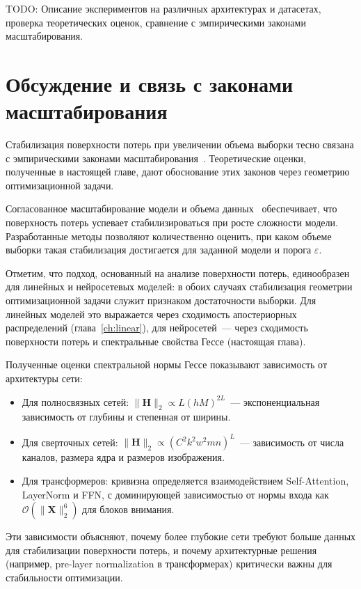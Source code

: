 TODO: Описание экспериментов на различных архитектурах и датасетах, проверка теоретических оценок, сравнение с эмпирическими законами масштабирования.

\section{Обсуждение и связь с законами масштабирования}

Стабилизация поверхности потерь при увеличении объема выборки тесно связана с эмпирическими законами масштабирования~\cite{kaplan2020scaling,hoffmann2022chinchila}. Теоретические оценки, полученные в настоящей главе, дают обоснование этих законов через геометрию оптимизационной задачи.

Согласованное масштабирование модели и объема данных~\cite{hoffmann2022chinchila} обеспечивает, что поверхность потерь успевает стабилизироваться при росте сложности модели. Разработанные методы позволяют количественно оценить, при каком объеме выборки такая стабилизация достигается для заданной модели и порога $\varepsilon$.

Отметим, что подход, основанный на анализе поверхности потерь, единообразен для линейных и нейросетевых моделей: в обоих случаях стабилизация геометрии оптимизационной задачи служит признаком достаточности выборки. Для линейных моделей это выражается через сходимость апостериорных распределений (глава~\ref{ch:linear}), для нейросетей~--- через сходимость поверхности потерь и спектральные свойства Гессе (настоящая глава).

Полученные оценки спектральной нормы Гессе показывают зависимость от архитектуры сети:
\begin{itemize}
\item Для полносвязных сетей: $\|\mathbf{H}\|_2 \propto L (hM)^{2L}$~--- экспоненциальная зависимость от глубины и степенная от ширины.
\item Для сверточных сетей: $\|\mathbf{H}\|_2 \propto (C^2 k^2 w^2 m n)^L$~--- зависимость от числа каналов, размера ядра и размеров изображения.
\item Для трансформеров: кривизна определяется взаимодействием Self-Attention, LayerNorm и FFN, с доминирующей зависимостью от нормы входа как $\mathcal{O}(\|\mathbf{X}\|_2^6)$ для блоков внимания.
\end{itemize}

Эти зависимости объясняют, почему более глубокие сети требуют больше данных для стабилизации поверхности потерь, и почему архитектурные решения (например, pre-layer normalization в трансформерах) критически важны для стабильности оптимизации.